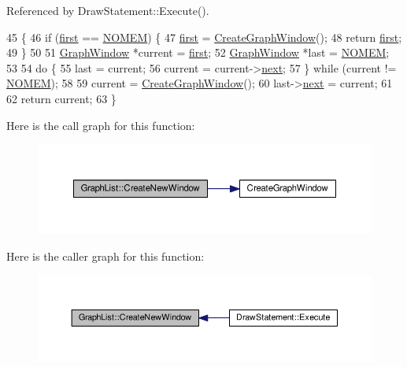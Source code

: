 Referenced by Draw\+Statement\+::\+Execute().


\begin{DoxyCode}
45 \{
46     \textcolor{keywordflow}{if} (\hyperlink{classGraphList_ad4646aa3e159fc56cd56ff82ebb9b48b}{first} == \hyperlink{platform_8h_a46ff2bfbf0d44b8466a2251d5bd5e6f8}{NOMEM}) \{
47         \hyperlink{classGraphList_ad4646aa3e159fc56cd56ff82ebb9b48b}{first} = \hyperlink{io_8h_a99482ffbe19cd5e821359f26620cd89f}{CreateGraphWindow}();
48         \textcolor{keywordflow}{return} \hyperlink{classGraphList_ad4646aa3e159fc56cd56ff82ebb9b48b}{first};
49     \}
50 
51     \hyperlink{classGraphWindow}{GraphWindow} *current = \hyperlink{classGraphList_ad4646aa3e159fc56cd56ff82ebb9b48b}{first};
52     \hyperlink{classGraphWindow}{GraphWindow} *last = \hyperlink{platform_8h_a46ff2bfbf0d44b8466a2251d5bd5e6f8}{NOMEM};
53 
54     \textcolor{keywordflow}{do} \{
55         last = current;
56         current = current->\hyperlink{classGraphWindow_af84f61254f44fd2ef6b45ab703e45feb}{next};
57     \} \textcolor{keywordflow}{while} (current != \hyperlink{platform_8h_a46ff2bfbf0d44b8466a2251d5bd5e6f8}{NOMEM});
58 
59     current = \hyperlink{io_8h_a99482ffbe19cd5e821359f26620cd89f}{CreateGraphWindow}();
60     last->\hyperlink{classGraphWindow_af84f61254f44fd2ef6b45ab703e45feb}{next} = current;
61 
62     \textcolor{keywordflow}{return} current;
63 \}
\end{DoxyCode}


Here is the call graph for this function\+:\nopagebreak
\begin{figure}[H]
\begin{center}
\leavevmode
\includegraphics[width=350pt]{classGraphList_a184e5ad986cd07281a96dc107ebfcd5d_cgraph}
\end{center}
\end{figure}




Here is the caller graph for this function\+:\nopagebreak
\begin{figure}[H]
\begin{center}
\leavevmode
\includegraphics[width=350pt]{classGraphList_a184e5ad986cd07281a96dc107ebfcd5d_icgraph}
\end{center}
\end{figure}




